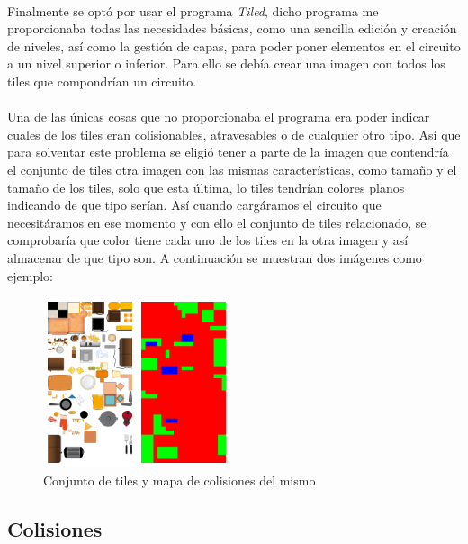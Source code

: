 \documentclass[a4paper,11pt]{article} %
\begin{document}
\paragraph{}
Finalmente se optó por usar el programa \emph{Tiled}, dicho programa me proporcionaba todas las necesidades básicas, como una 
sencilla edición y creación de niveles, así como la gestión de capas, para poder poner elementos en el circuito a un nivel 
superior o inferior. Para ello se debía crear una imagen con todos los tiles que compondrían un circuito.

\paragraph{}
Una de las únicas cosas que no proporcionaba el programa era poder indicar cuales de los tiles eran colisionables, atravesables o
de cualquier otro tipo. Así que para solventar este problema se eligió tener a parte de la imagen que contendría el conjunto de 
tiles otra imagen con las mismas características, como tamaño y el tamaño de los tiles, solo que esta última, lo tiles tendrían 
colores planos indicando de que tipo serían. Así cuando cargáramos el circuito
que necesitáramos en ese momento y con ello
el conjunto de tiles relacionado, se comprobaría que color tiene cada uno de los tiles en la otra imagen y así almacenar
de que tipo son. A continuación se muestran dos imágenes como ejemplo:

\begin{figure}[H]
  \label{tileset}
  \begin{center}
    \includegraphics[scale=1]{imagenes/tileset-collisionmap.png}
  \end{center}
  \caption{Conjunto de tiles y mapa de colisiones del mismo}
\end{figure}

\subsection{Colisiones}
\end{document}
